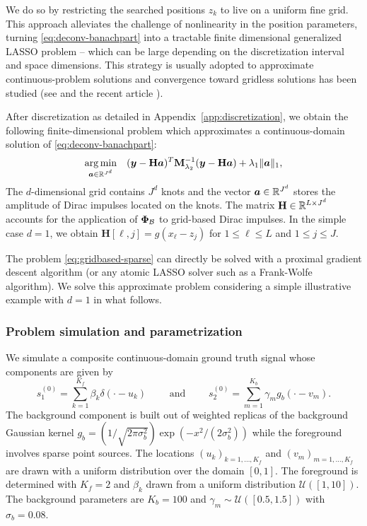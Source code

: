 \documentclass[12pt]{article}
\begin{document}
        We do so by restricting the searched positions $z_k$ to live on a uniform fine grid. This approach alleviates the challenge of nonlinearity in the position parameters, turning \eqref{eq:deconv-banachpart} into a tractable finite dimensional generalized LASSO problem -- which can be large depending on the discretization interval and space dimensions. This strategy is usually adopted to approximate continuous-problem solutions \cite{simeoni2020functional,Debarre2019} and convergence toward gridless solutions has been studied (see \cite{duval2017sparseI,debarre2022part2} and the recent article \cite{guillemet2025a}). 

        After discretization as detailed in Appendix~\ref{app:discretization}, we obtain the following finite-dimensional problem which approximates a continuous-domain solution of \eqref{eq:deconv-banachpart}:
        \begin{equation}
            \label{eq:gridbased-sparse}
            \underset{ \bm{a} \in \mathbb{R}^{J^d}}{\arg\min} \quad ( \bm{y} - \mathbf{H}\bm{a}  )^T \mathbf{M}_{\lambda_{2}}^{-1} ( \bm{y} - \mathbf{H}\bm{a}  )  + \lambda_{1} \| \bm{a} \|_{1},
        \end{equation}
        The $d$-dimensional grid contains $J^d$ knots and the vector $\bm{a}\in\mathbb{R}^{J^d}$ stores the amplitude of Dirac impulses located on the knots.
        The matrix $\mathbf{H} \in \mathbb{R}^{L \times J^d}$ accounts for the application of $\bm{\Phi}_\mathcal{B}$ to grid-based Dirac impulses.
        In the simple case $d=1$, we obtain $\mathbf{H}[\ell, j] = g(x_{\ell} - z_j)$ for $1 \leq \ell \leq L $ and $1 \leq j \leq J$.
        
        The problem \eqref{eq:gridbased-sparse} can directly be solved with a proximal gradient descent algorithm (or any atomic LASSO solver such as a Frank-Wolfe algorithm). We solve this approximate problem considering a simple illustrative example with $d=1$ in what follows.

        \subsubsection{Problem simulation and parametrization}

            We simulate a composite continuous-domain ground truth signal whose components are given by 
            $$s_1^{(0)} = \sum_{k=1}^{K_f} \beta_ k \delta(\cdot - u_k) \qquad\text{ and }\qquad s_2^{(0)} = \sum_{m=1}^{K_b} \gamma_m g_b(\cdot - v_m).
            $$
            The background component is built out of weighted replicas of the background Gaussian kernel $g_b = (1/\sqrt{2\pi\sigma_b^2}) \exp{(-x^2/(2 \sigma_b^2))}$ while the foreground involves sparse point sources. The locations $(u_k)_{k=1, \dots, K_f}$ and $(v_m)_{m=1, \dots, K_f}$ are drawn with a uniform distribution over the domain $[0, 1]$. The foreground is determined with $K_f = 2$ and $\beta_k$ drawn from a uniform distribution $\mathcal{U}([1, 10])$. The background parameters are $K_b = 100$ and $\gamma_m \sim \mathcal{U}([0.5, 1.5])$ with $\sigma_b = 0.08$.
            
\end{document}
